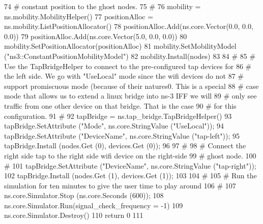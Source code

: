 \begin{DoxyCode}
74     \textcolor{comment}{# constant position to the ghost nodes.}
75     \textcolor{comment}{#}
76     mobility = ns.mobility.MobilityHelper()
77     positionAlloc = ns.mobility.ListPositionAllocator()
78     positionAlloc.Add(ns.core.Vector(0.0, 0.0, 0.0))
79     positionAlloc.Add(ns.core.Vector(5.0, 0.0, 0.0))
80     mobility.SetPositionAllocator(positionAlloc)
81     mobility.SetMobilityModel (\textcolor{stringliteral}{"ns3::ConstantPositionMobilityModel"})
82     mobility.Install(nodes)
83 
84     \textcolor{comment}{#}
85     \textcolor{comment}{# Use the TapBridgeHelper to connect to the pre-configured tap devices for }
86     \textcolor{comment}{# the left side.  We go with "UseLocal" mode since the wifi devices do not}
87     \textcolor{comment}{# support promiscuous mode (because of their natures0.  This is a special}
88     \textcolor{comment}{# case mode that allows us to extend a linux bridge into ns-3 IFF we will}
89     \textcolor{comment}{# only see traffic from one other device on that bridge.  That is the case}
90     \textcolor{comment}{# for this configuration.}
91     \textcolor{comment}{#}
92     tapBridge = ns.tap\_bridge.TapBridgeHelper()
93     tapBridge.SetAttribute (\textcolor{stringliteral}{"Mode"}, ns.core.StringValue (\textcolor{stringliteral}{"UseLocal"}));
94     tapBridge.SetAttribute (\textcolor{stringliteral}{"DeviceName"}, ns.core.StringValue (\textcolor{stringliteral}{"tap-left"}));
95     tapBridge.Install (nodes.Get (0), devices.Get (0));
96 
97     \textcolor{comment}{#}
98     \textcolor{comment}{# Connect the right side tap to the right side wifi device on the right-side}
99     \textcolor{comment}{# ghost node.}
100     \textcolor{comment}{#}
101     tapBridge.SetAttribute (\textcolor{stringliteral}{"DeviceName"}, ns.core.StringValue (\textcolor{stringliteral}{"tap-right"}));
102     tapBridge.Install (nodes.Get (1), devices.Get (1));
103 
104     \textcolor{comment}{#}
105     \textcolor{comment}{# Run the simulation for ten minutes to give the user time to play around}
106     \textcolor{comment}{#}
107     ns.core.Simulator.Stop (ns.core.Seconds (600));
108     ns.core.Simulator.Run(signal\_check\_frequency = -1)
109     ns.core.Simulator.Destroy()
110     \textcolor{keywordflow}{return} 0
111 
\end{DoxyCode}
